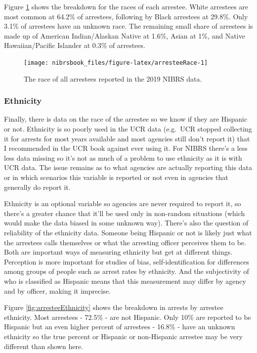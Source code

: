 \documentclass[
  12pt,
  openany]{book}
\begin{document}
Figure \ref{fig:arresteeRace} shows the breakdown for the races of each arrestee. White arrestees are most common at 64.2\% of arrestees, following by Black arrestees at 29.8\%. Only 3.1\% of arrestees have an unknown race. The remaining small share of arrestees is made up of American Indian/Alaskan Native at 1.6\%, Asian at 1\%, and Native Hawaiian/Pacific Islander at 0.3\% of arrestees.

\begin{figure}

{\centering \texttt{[image: nibrsbook\_files/figure-latex/arresteeRace-1]} 

}

\caption{The race of all arrestees reported in the 2019 NIBRS data.}\label{fig:arresteeRace}
\end{figure}

\hypertarget{ethnicity-1}{%
\subsubsection{Ethnicity}\label{ethnicity-1}}

Finally, there is data on the race of the arrestee so we know if they are Hispanic or not. Ethnicity is so poorly used in the UCR data (e.g.~UCR stopped collecting it for arrests for most years available and most agencies still don't report it) that I recommended in the UCR book against ever using it. For NIBRS there's a less less data missing so it's not as much of a problem to use ethnicity as it is with UCR data. The issue remains as to what agencies are actually reporting this data or in which scenarios this variable is reported or not even in agencies that generally do report it.

Ethnicity is an optional variable so agencies are never required to report it, so there's a greater chance that it'll be used only in non-random situations (which would make the data biased in some unknown way). There's also the question of reliability of the ethnicity data. Someone being Hispanic or not is likely just what the arrestees calls themselves or what the arresting officer perceives them to be. Both are important ways of measuring ethnicity but get at different things. Perception is more important for studies of bias, self-identification for differences among groups of people such as arrest rates by ethnicity. And the subjectivity of who is classified as Hispanic means that this measurement may differ by agency and by officer, making it imprecise.

Figure \ref{fig:arresteeEthnicity} shows the breakdown in arrests by arrestee ethnicity. Most arrestees - 72.5\% - are not Hispanic. Only 10\% are reported to be Hispanic but an even higher percent of arrestees - 16.8\% - have an unknown ethnicity so the true percent or Hispanic or non-Hispanic arrestee may be very different than shown here.
\end{document}
